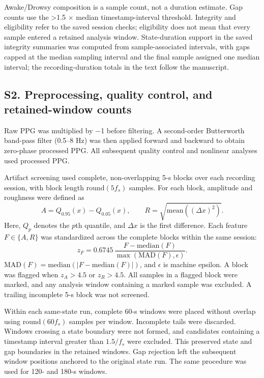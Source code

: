 \begin{table}[p]
\par\smallskip
\begin{minipage}{0.98\linewidth}
\footnotesize Awake/Drowsy composition is a sample count, not a duration estimate. Gap counts use the >1.5 $\times$ median timestamp-interval threshold. Integrity and eligibility refer to the saved session checks; eligibility does not mean that every sample entered a retained analysis window. State-duration support in the saved integrity summaries was computed from sample-associated intervals, with gaps capped at the median sampling interval and the final sample assigned one median interval; the recording-duration totals in the text follow the manuscript.
\end{minipage}
\end{table}

\subsection*{S2. Preprocessing, quality control, and retained-window counts}

Raw PPG was multiplied by $-$1 before filtering. A second-order Butterworth band-pass filter (0.5--8 Hz) was then applied forward and backward to obtain zero-phase processed PPG. All subsequent quality control and nonlinear analyses used processed PPG.

Artifact screening used complete, non-overlapping 5-s blocks over each recording session, with block length $\mathrm{round}(5f_s)$ samples. For each block, amplitude and roughness were defined as
\[ A=Q_{0.95}(x)-Q_{0.05}(x),\qquad R=\sqrt{\mathrm{mean}((\Delta x)^2)}. \]
Here, $Q_p$ denotes the $p$th quantile, and $\Delta x$ is the first difference. Each feature $F\in\{A,R\}$ was standardized across the complete blocks within the same session:
\[ z_F=0.6745\,\frac{F-\mathrm{median}(F)}{\max(\mathrm{MAD}(F),\epsilon)}. \]
$\mathrm{MAD}(F)=\mathrm{median}(|F-\mathrm{median}(F)|)$, and $\epsilon$ is machine epsilon. A block was flagged when $z_A>4.5$ or $z_R>4.5$. All samples in a flagged block were marked, and any analysis window containing a marked sample was excluded. A trailing incomplete 5-s block was not screened.

Within each same-state run, complete 60-s windows were placed without overlap using $\mathrm{round}(60f_s)$ samples per window. Incomplete tails were discarded. Windows crossing a state boundary were not formed, and candidates containing a timestamp interval greater than $1.5/f_s$ were excluded. This preserved state and gap boundaries in the retained windows. Gap rejection left the subsequent window positions anchored to the original state run. The same procedure was used for 120- and 180-s windows.

